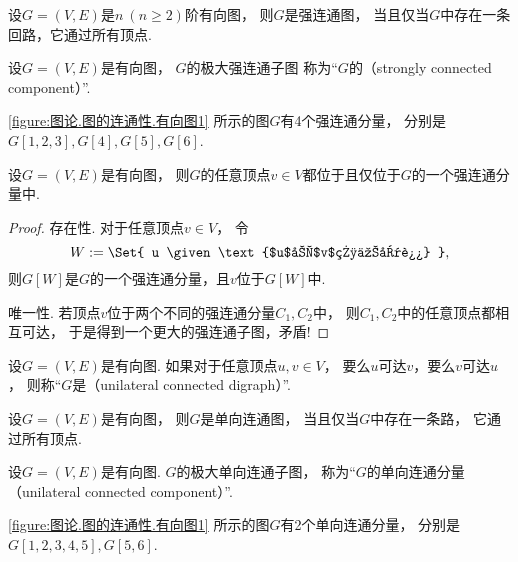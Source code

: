 \begin{theorem}
设\(G = (V,E)\)是\(n\ (n\geq2)\)阶有向图，
则\(G\)是强连通图，
当且仅当\(G\)中存在一条回路，它通过所有顶点.
\end{theorem}

\begin{definition}
设\(G = (V,E)\)是有向图，
\(G\)的极大强连通子图
称为“\(G\)的（strongly connected component）”.
\end{definition}

\cref{figure:图论.图的连通性.有向图1} 所示的图\(G\)有4个强连通分量，
分别是\(G[1,2,3],G[4],G[5],G[6]\).

\begin{theorem}
设\(G = (V,E)\)是有向图，
则\(G\)的任意顶点\(v \in V\)都位于且仅位于\(G\)的一个强连通分量中.
\begin{proof}
存在性.
对于任意顶点\(v \in V\)，
令\begin{equation*}
	W \defeq \Set{ u \given \text{$u$和$v$相互可达} },
\end{equation*}
则\(G[W]\)是\(G\)的一个强连通分量，且\(v\)位于\(G[W]\)中.

唯一性.
若顶点\(v\)位于两个不同的强连通分量\(C_1,C_2\)中，
则\(C_1,C_2\)中的任意顶点都相互可达，
于是得到一个更大的强连通子图，矛盾!
\end{proof}
\end{theorem}

\begin{definition}
设\(G = (V,E)\)是有向图.
如果对于任意顶点\(u,v \in V\)，
要么\(u\)可达\(v\)，要么\(v\)可达\(u\)，
则称“\(G\)是（unilateral connected digraph）”.
\end{definition}

\begin{theorem}
设\(G = (V,E)\)是有向图，
则\(G\)是单向连通图，
当且仅当\(G\)中存在一条路，
它通过所有顶点.
\end{theorem}

\begin{definition}
设\(G = (V,E)\)是有向图.
\(G\)的极大单向连通子图，
称为“\(G\)的单向连通分量（unilateral connected component）”.
\end{definition}

\cref{figure:图论.图的连通性.有向图1} 所示的图\(G\)有2个单向连通分量，
分别是\(G[1,2,3,4,5],G[5,6]\).

